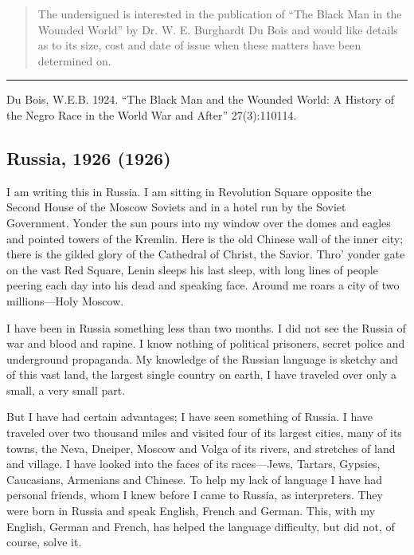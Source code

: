 \documentclass[letterpaper,10pt,english]{jupyterBook}
\begin{document}
\sphinxAtStartPar
{}
\begin{quote}

\sphinxAtStartPar
The undersigned is interested in the publication of “The Black Man in the Wounded World” by Dr. W. E. Burghardt Du Bois and would like details as to its size, cost and date of issue when these matters have been determined on.
\end{quote}


\bigskip\hrule\bigskip


\sphinxAtStartPar
{} Du Bois, W.E.B. 1924. “The Black Man and the Wounded World: A History of the Negro Race in the World War and After” 27(3):110\sphinxhyphen{}114.


\subsection{Russia, 1926 (1926)}
\label{\detokenize{Volumes/33/01/russia_1926:russia-1926-1926}}\label{\detokenize{Volumes/33/01/russia_1926::doc}}
\sphinxAtStartPar
I am writing this in Russia. I am sitting in Revolution Square opposite the Second House of the Moscow Soviets and in a hotel run by the Soviet Government. Yonder the sun pours into my window over the domes and eagles and pointed towers of the Kremlin. Here is the old Chinese wall of the inner city; there is the gilded glory of the Cathedral of Christ, the Savior. Thro’ yonder gate on the vast Red Square, Lenin sleeps his last sleep, with long lines of people peering each day into his dead and speaking face. Around me roars a city of two millions—Holy Moscow.

\sphinxAtStartPar
I have been in Russia something less than two months. I did not see the Russia of war and blood and rapine. I know nothing of political prisoners, secret police and underground propaganda. My knowledge of the Russian language is sketchy and of this vast land, the largest single country on earth, I have traveled over only a small, a very small part.

\sphinxAtStartPar
But I have had certain advantages; I have seen something of Russia. I have traveled over two thousand miles and visited four of its largest cities, many of its towns, the Neva, Dneiper, Moscow and Volga of its rivers, and stretches of land and village. I have looked into the faces of its races—Jews, Tartars, Gypsies, Caucasians, Armenians and Chinese. To help my lack of language I have had personal friends, whom I knew before I came to Russia, as interpreters. They were born in Russia and speak English, French and German. This, with my English, German and French, has helped the language difficulty, but did not, of course, solve it.
\end{document}
